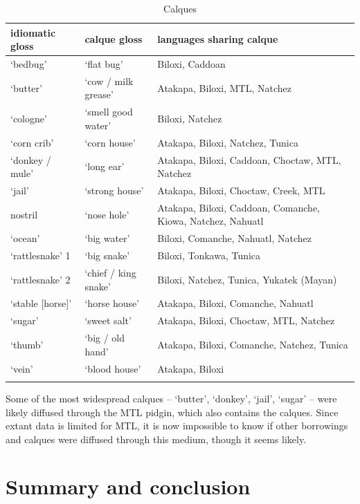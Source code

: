 \documentclass[output=paper]{LSP/langsci}
\begin{document}
\begin{table}
\caption{Calques} \label{calques}
\begin{tabularx}{\textwidth}{ llX }
\lsptoprule
 idiomatic gloss & calque gloss & languages sharing calque
\\ \midrule `bedbug' & `flat bug' & Biloxi, Caddoan
\\ `butter' & `cow / milk grease' & Atakapa, Biloxi, MTL, Natchez 
\\ `cologne' & `smell good water' & Biloxi, Natchez
\\ `corn crib' & `corn house' & Atakapa, Biloxi, Natchez,  Tunica 
\\ `donkey / mule' & `long ear' & Atakapa, Biloxi, Caddoan,    Choctaw, MTL, Natchez
\\ `jail' & `strong house' & Atakapa, Biloxi, Choctaw, Creek,    MTL 
\\ nostril & `nose hole' & Atakapa, Biloxi, Caddoan,   Comanche, Kiowa, Natchez, Nahuatl
\\ `ocean' & `big water' & Biloxi, Comanche, Nahuatl,   Natchez 
\\ `rattlesnake' 1 & `big snake' & Biloxi, Tonkawa, Tunica 
\\ `rattlesnake' 2 & `chief / king snake' & Biloxi, Natchez, Tunica, Yukatek   (Mayan)
\\ `stable [horse]' & `horse house' & Atakapa, Biloxi, Comanche,  Nahuatl
\\ `sugar' & `sweet salt' & Atakapa, Biloxi, Choctaw, MTL, Natchez 
\\ `thumb' & `big / old hand' & Atakapa, Biloxi, Comanche,  Natchez, Tunica 
\\ `vein' & `blood house' & Atakapa, Biloxi 
\\ \lspbottomrule
\end{tabularx}\end{table}

	Some of the most widespread calques -- `butter', `donkey', `jail', `sugar' -- were likely diffused through the MTL pidgin, which also contains the calques. Since extant data is limited for MTL, it is now impossible to know if other borrowings and calques were diffused through this medium, though it seems likely.

\section{Summary and conclusion}
	
\end{document}
